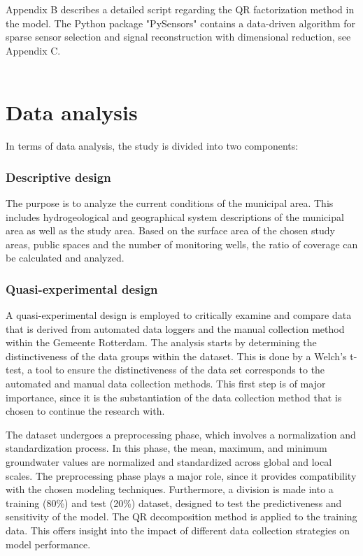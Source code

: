 Appendix B describes a detailed script regarding the QR factorization method in the model. The Python package "PySensors" contains a data-driven algorithm for sparse sensor selection and signal reconstruction with dimensional reduction, see Appendix C.\\
\\
\section{Data analysis}
In terms of data analysis, the study is divided into two components:
\subsubsection{Descriptive design}
The purpose is to analyze the current conditions of the municipal area. This includes hydrogeological and geographical system descriptions of the municipal area as well as the study area. Based on the surface area of the chosen study areas, public spaces and the number of monitoring wells, the ratio of coverage can be calculated and analyzed.

\subsubsection{Quasi-experimental design}
A quasi-experimental design is employed to critically examine and compare data that is derived from automated data loggers and the manual collection method within the Gemeente Rotterdam. The analysis starts by determining the distinctiveness of the data groups within the dataset. This is done by a Welch’s t-test, a tool to ensure the distinctiveness of the data set corresponds to the automated and manual data collection methods. This first step is of major importance, since it is the substantiation of the data collection method that is chosen to continue the research with. 

The dataset undergoes a preprocessing phase, which involves a normalization and standardization process. In this phase, the mean, maximum, and minimum groundwater values are normalized and standardized across global and local scales. The preprocessing phase plays a major role, since it provides compatibility with the chosen modeling techniques. Furthermore, a division is made into a training (80\%) and test (20\%) dataset, designed to test the predictiveness and sensitivity of the model. The QR decomposition method is applied to the training data. This offers insight into the impact of different data collection strategies on model performance. 

